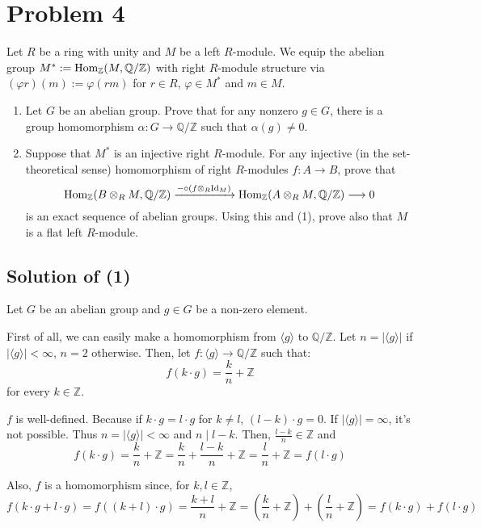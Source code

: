 \documentclass{article}
\newcommand{\bbQ}{\mathbb{Q}}
\newcommand{\bbZ}{\mathbb{Z}}
\newcommand{\Hom}{\textnormal{Hom}}
\newcommand{\Id}{\textnormal{Id}}
\begin{document}
\newpage
\section*{Problem 4}

Let \(R\) be a ring with unity
and \(M\) be a left \(R\)-module.
We equip the abelian group \(M^* := \Hom_\bbZ(M, \bbQ/\bbZ)\)
with right \(R\)-module structure via
\((\varphi r)(m) := \varphi(rm)\) for \(r \in R\), \(\varphi \in M^*\) and \(m \in M\).
\begin{enumerate}[label=(\arabic*)]
\item
  Let \(G\) be an abelian group.
  Prove that for any nonzero \(g \in G\), there is a group homomorphism \(\alpha: G \to \bbQ / \bbZ\) such that \(\alpha(g) \neq 0\).
\item
  Suppose that \(M^*\) is an injective right \(R\)-module.
  For any injective (in the set-theoretical sense) homomorphism of right \(R\)-modules \(f: A \to B\), prove that
  \[\Hom_\bbZ(B \otimes_R M, \bbQ/\bbZ)
    \xrightarrow{- \circ (f \otimes_R \Id_M)}
    \Hom_\bbZ(A \otimes_R M, \bbQ/\bbZ)
    \longrightarrow
    0\]
  is an exact sequence of abelian groups.
  Using this and (1), prove also that \(M\) is a flat left \(R\)-module.
\end{enumerate}

\subsection*{Solution of (1)}

Let \(G\) be an abelian group and \(g \in G\) be a non-zero element.

First of all, we can easily make a homomorphism from \(\langle g \rangle\)
to \(\bbQ/\bbZ\).
Let \(n = |\langle g \rangle|\) if \(|\langle g \rangle| < \infty\),
 \(n = 2\) otherwise.
Then, let \(f: \langle g \rangle \to \bbQ/\bbZ\) such that:
\[f(k \cdot g) = \frac{k}{n} + \bbZ\]
for every \(k \in \bbZ\).

\(f\) is well-defined. Because if \(k \cdot g = l \cdot g\) for \(k \neq l\), \((l - k) \cdot g = 0\).
If \(|\langle g \rangle| = \infty\), it's not possible.
Thus \(n = |\langle g \rangle| < \infty\) and \(n \mid l - k\).
Then, \(\frac{l - k}{n} \in \bbZ\) and
\[f(k \cdot g) = \frac{k}{n} + \bbZ = \frac{k}{n} + \frac{l - k}{n} + \bbZ
  = \frac{l}{n} + \bbZ = f(l \cdot g)\]

Also, \(f\) is a homomorphism since, for \(k, l \in \bbZ\),
\[f(k \cdot g + l \cdot g) = f((k + l) \cdot g) = \frac{k + l}{n} + \bbZ = \left(\frac{k}{n} + \bbZ\right) + \left(\frac{l}{n} + \bbZ\right) = f(k \cdot g) + f(l \cdot g)\]
\end{document}
